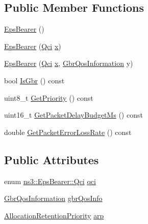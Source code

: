 \subsection*{Public Member Functions}
\begin{DoxyCompactItemize}
\item 
\hyperlink{structns3_1_1EpsBearer_af6f94c7bbd1d1bc26e6895d19cf26086}{Eps\+Bearer} ()
\item 
\hyperlink{structns3_1_1EpsBearer_a59992629343669a101f83b61a581b889}{Eps\+Bearer} (\hyperlink{structns3_1_1EpsBearer_aecf0c67109c5eb4ec0b07226fff5885e}{Qci} \hyperlink{lte__link__budget__x2__handover__measures_8m_a9336ebf25087d91c818ee6e9ec29f8c1}{x})
\item 
\hyperlink{structns3_1_1EpsBearer_a2116aa47ad61ee19ddc726558bc90cb8}{Eps\+Bearer} (\hyperlink{structns3_1_1EpsBearer_aecf0c67109c5eb4ec0b07226fff5885e}{Qci} \hyperlink{lte__link__budget__x2__handover__measures_8m_a9336ebf25087d91c818ee6e9ec29f8c1}{x}, \hyperlink{structns3_1_1GbrQosInformation}{Gbr\+Qos\+Information} y)
\item 
bool \hyperlink{structns3_1_1EpsBearer_a06534436808cbdf87740201e143568c5}{Is\+Gbr} () const 
\item 
uint8\+\_\+t \hyperlink{structns3_1_1EpsBearer_abcc1f9d1c22d77ab26c57cf550d37363}{Get\+Priority} () const 
\item 
uint16\+\_\+t \hyperlink{structns3_1_1EpsBearer_a0f2f37b3f2d1dc3dcba4176651e3aec7}{Get\+Packet\+Delay\+Budget\+Ms} () const 
\item 
double \hyperlink{structns3_1_1EpsBearer_a0c50be088cc0ad1d0010492ddd601252}{Get\+Packet\+Error\+Loss\+Rate} () const 
\end{DoxyCompactItemize}
\subsection*{Public Attributes}
\begin{DoxyCompactItemize}
\item 
enum \hyperlink{structns3_1_1EpsBearer_aecf0c67109c5eb4ec0b07226fff5885e}{ns3\+::\+Eps\+Bearer\+::\+Qci} \hyperlink{structns3_1_1EpsBearer_a9d5f4e6cb35091c9883cc7dd4b2d95db}{qci}
\item 
\hyperlink{structns3_1_1GbrQosInformation}{Gbr\+Qos\+Information} \hyperlink{structns3_1_1EpsBearer_ad24c092b1584eee3ae904b4b0fcf45cb}{gbr\+Qos\+Info}
\item 
\hyperlink{structns3_1_1AllocationRetentionPriority}{Allocation\+Retention\+Priority} \hyperlink{structns3_1_1EpsBearer_a21ff4ef25028190028f0f31a60516b88}{arp}
\end{DoxyCompactItemize}


